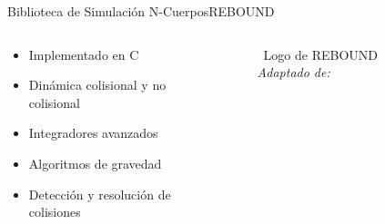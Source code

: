 \begin{frame}{Biblioteca de Simulación N-Cuerpos}{REBOUND}
    \begin{columns}
        \begin{column}{0.6\textwidth}
            \begin{itemize}
                \item Implementado en C
                \item Dinámica colisional y no colisional
                \item Integradores avanzados
                \item Algoritmos de gravedad
                \item Detección y resolución de colisiones
            \end{itemize}
        \end{column}
        \begin{column}{0.4\textwidth}
            \centering
            \begin{figure}[H]
                \centering
                \vspace{-0.25cm}
                \caption{\tiny~Logo de REBOUND \textit{Adaptado de:}~\cite{Rein2012}}%
                \label{fig:REBOUND_logo}
            \end{figure}
        \end{column}
    \end{columns}
\end{frame}

